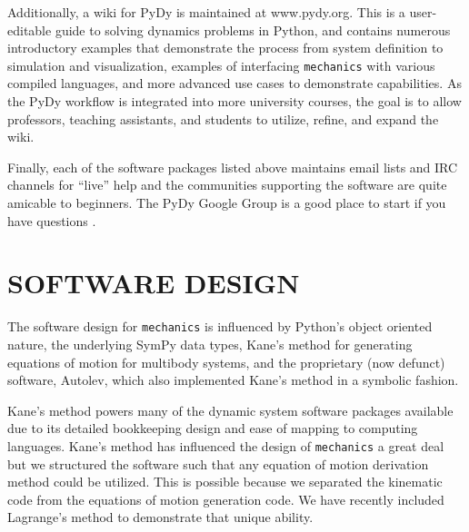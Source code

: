\documentclass[twocolumn,10pt]{asme2e}
\begin{document}
Additionally, a wiki for PyDy is maintained at www.pydy.org. This is a
user-editable guide to solving dynamics problems in Python, and contains
numerous introductory examples that demonstrate the process from system
definition to simulation and visualization, examples of interfacing
\verb|mechanics| with various compiled languages, and more advanced use cases
to demonstrate capabilities. As the PyDy workflow is integrated into more
university courses, the goal is to allow professors, teaching assistants, and
students to utilize, refine, and expand the wiki.

Finally, each of the software packages listed above maintains email lists and
IRC channels for ``live'' help and the communities supporting the software are
quite amicable to beginners. The PyDy Google Group is a good place to start if
you have questions \cite{PyDyGoogleGroup}.
%
\section*{SOFTWARE DESIGN}
The software design for \verb|mechanics| is influenced by Python's object
oriented nature, the underlying SymPy data types, Kane’s method for generating
equations of motion\cite{Kane1985} for multibody systems, and the proprietary
(now defunct) software, Autolev\cite{Kane2000}, which also implemented Kane's
method in a symbolic fashion.

Kane’s method powers many of the dynamic system software packages available
\cite{Sayers1990, Enlighten2013} due to its detailed bookkeeping design and
ease of mapping to computing languages. Kane’s method  has influenced the
design of \verb|mechanics| a great deal but we structured the software such
that any equation of motion derivation method could be utilized. This is
possible because we separated the kinematic code from the equations of motion
generation code. We have recently included Lagrange’s method to demonstrate
that unique ability.
\end{document}

